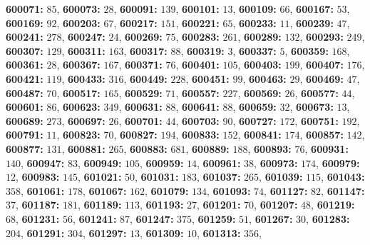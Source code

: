 \textsf{\bfseries 600071:} $85$, \textsf{\bfseries 600073:} $28$, \textsf{\bfseries 600091:} $139$, \textsf{\bfseries 600101:} $13$, \textsf{\bfseries 600109:} $66$, \textsf{\bfseries 600167:} $53$, \textsf{\bfseries 600169:} $92$, \textsf{\bfseries 600203:} $67$, \textsf{\bfseries 600217:} $151$, \textsf{\bfseries 600221:} $65$, \textsf{\bfseries 600233:} $11$, \textsf{\bfseries 600239:} $47$, \textsf{\bfseries 600241:} $278$, \textsf{\bfseries 600247:} $24$, \textsf{\bfseries 600269:} $75$, \textsf{\bfseries 600283:} $261$, \textsf{\bfseries 600289:} $132$, \textsf{\bfseries 600293:} $249$, \textsf{\bfseries 600307:} $129$, \textsf{\bfseries 600311:} $163$, \textsf{\bfseries 600317:} $88$, \textsf{\bfseries 600319:} $3$, \textsf{\bfseries 600337:} $5$, \textsf{\bfseries 600359:} $168$, \textsf{\bfseries 600361:} $28$, \textsf{\bfseries 600367:} $167$, \textsf{\bfseries 600371:} $76$, \textsf{\bfseries 600401:} $105$, \textsf{\bfseries 600403:} $199$, \textsf{\bfseries 600407:} $176$, \textsf{\bfseries 600421:} $119$, \textsf{\bfseries 600433:} $316$, \textsf{\bfseries 600449:} $228$, \textsf{\bfseries 600451:} $99$, \textsf{\bfseries 600463:} $29$, \textsf{\bfseries 600469:} $47$, \textsf{\bfseries 600487:} $70$, \textsf{\bfseries 600517:} $165$, \textsf{\bfseries 600529:} $71$, \textsf{\bfseries 600557:} $227$, \textsf{\bfseries 600569:} $26$, \textsf{\bfseries 600577:} $44$, \textsf{\bfseries 600601:} $86$, \textsf{\bfseries 600623:} $349$, \textsf{\bfseries 600631:} $88$, \textsf{\bfseries 600641:} $88$, \textsf{\bfseries 600659:} $32$, \textsf{\bfseries 600673:} $13$, \textsf{\bfseries 600689:} $273$, \textsf{\bfseries 600697:} $26$, \textsf{\bfseries 600701:} $44$, \textsf{\bfseries 600703:} $90$, \textsf{\bfseries 600727:} $172$, \textsf{\bfseries 600751:} $192$, \textsf{\bfseries 600791:} $11$, \textsf{\bfseries 600823:} $70$, \textsf{\bfseries 600827:} $194$, \textsf{\bfseries 600833:} $152$, \textsf{\bfseries 600841:} $174$, \textsf{\bfseries 600857:} $142$, \textsf{\bfseries 600877:} $131$, \textsf{\bfseries 600881:} $265$, \textsf{\bfseries 600883:} $681$, \textsf{\bfseries 600889:} $188$, \textsf{\bfseries 600893:} $76$, \textsf{\bfseries 600931:} $140$, \textsf{\bfseries 600947:} $83$, \textsf{\bfseries 600949:} $105$, \textsf{\bfseries 600959:} $14$, \textsf{\bfseries 600961:} $38$, \textsf{\bfseries 600973:} $174$, \textsf{\bfseries 600979:} $12$, \textsf{\bfseries 600983:} $145$, \textsf{\bfseries 601021:} $50$, \textsf{\bfseries 601031:} $183$, \textsf{\bfseries 601037:} $265$, \textsf{\bfseries 601039:} $115$, \textsf{\bfseries 601043:} $358$, \textsf{\bfseries 601061:} $178$, \textsf{\bfseries 601067:} $162$, \textsf{\bfseries 601079:} $134$, \textsf{\bfseries 601093:} $74$, \textsf{\bfseries 601127:} $82$, \textsf{\bfseries 601147:} $37$, \textsf{\bfseries 601187:} $181$, \textsf{\bfseries 601189:} $113$, \textsf{\bfseries 601193:} $27$, \textsf{\bfseries 601201:} $70$, \textsf{\bfseries 601207:} $48$, \textsf{\bfseries 601219:} $68$, \textsf{\bfseries 601231:} $56$, \textsf{\bfseries 601241:} $87$, \textsf{\bfseries 601247:} $375$, \textsf{\bfseries 601259:} $51$, \textsf{\bfseries 601267:} $30$, \textsf{\bfseries 601283:} $204$, \textsf{\bfseries 601291:} $304$, \textsf{\bfseries 601297:} $13$, \textsf{\bfseries 601309:} $10$, \textsf{\bfseries 601313:} $356$, 
